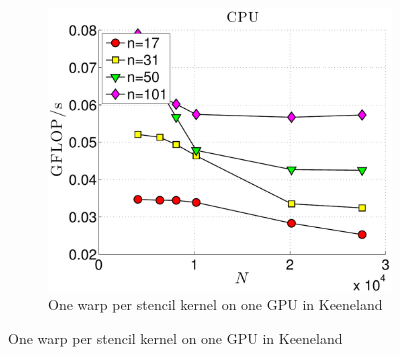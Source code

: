 \begin{figure}
\centering
\begin{subfigure}[t]{0.425\textwidth}
\includegraphics[width=1.0\textwidth]{../figures/keeneland_results/alltoallv/gflops_cpu_1proc_oneWarpPerStencil-eps-converted-to.pdf}
\caption{One warp per stencil kernel on one GPU in Keeneland}
\label{fig:gflops_cpu_1proc_keeneland}
\end{subfigure} 


\end{figure}
